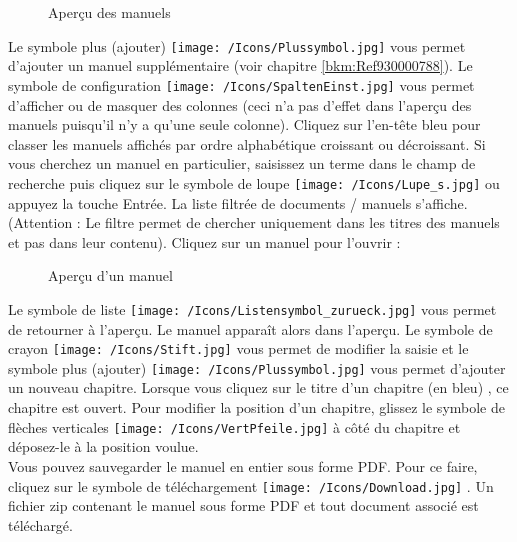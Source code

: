 \vspace{3cm}  

\begin{figure}[H]
\caption{Aperçu des manuels}
\end{figure}

Le symbole plus (ajouter) \texttt{[image: /Icons/Plussymbol.jpg]}  vous permet d'ajouter un manuel supplémentaire (voir chapitre \ref{bkm:Ref930000788}). Le symbole de configuration \texttt{[image: /Icons/SpaltenEinst.jpg]}  vous permet d'afficher ou de masquer des colonnes (ceci n'a pas d'effet dans l'aperçu des manuels puisqu'il n'y a qu'une seule colonne). Cliquez sur l'en-tête bleu  pour classer les manuels affichés par ordre alphabétique croissant ou décroissant. Si vous cherchez un manuel en particulier, saisissez un terme dans le champ de recherche  puis cliquez sur le symbole de loupe \texttt{[image: /Icons/Lupe\_s.jpg]} ou appuyez la touche Entrée. La liste filtrée de documents / manuels s'affiche. (Attention : Le filtre permet de chercher uniquement dans les titres des manuels et pas dans leur contenu). Cliquez sur un manuel  pour l'ouvrir :

\begin{figure}[H]
\caption{Aperçu d'un manuel}
\end{figure}

Le symbole de liste \texttt{[image: /Icons/Listensymbol\_zurueck.jpg]}  vous permet de retourner à l'aperçu. Le manuel apparaît alors dans l'aperçu. Le symbole de crayon \texttt{[image: /Icons/Stift.jpg]}  vous permet de modifier la saisie et le symbole plus (ajouter) \texttt{[image: /Icons/Plussymbol.jpg]}  vous permet d'ajouter un nouveau chapitre. Lorsque vous cliquez sur le titre d'un chapitre (en bleu) , ce chapitre est ouvert. Pour modifier la position d'un chapitre, glissez le symbole de flèches verticales \texttt{[image: /Icons/VertPfeile.jpg]}  à côté du chapitre et déposez-le à la position voulue. \\
Vous pouvez sauvegarder le manuel en entier sous forme PDF. Pour ce faire, cliquez sur le symbole de téléchargement \texttt{[image: /Icons/Download.jpg]} . Un fichier zip contenant le manuel sous forme PDF et tout document associé est téléchargé.

